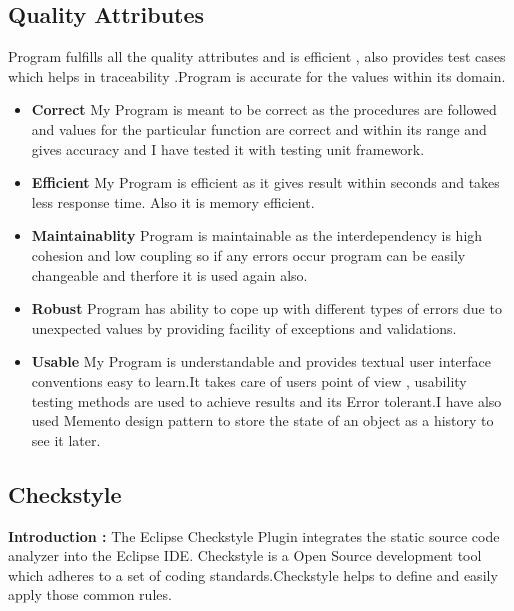 \documentclass[12pt]{report}
\begin{document}
\subsection{Quality Attributes}
\noindent  Program fulfills all the quality attributes and is efficient , also provides test cases which helps in traceability .Program is accurate for the values within its domain.
\begin{itemize}
    \item\textbf {Correct}
    \newline
    My Program is meant to be correct as the procedures are followed and values for the particular function are correct and within its range and gives accuracy and I have tested it with testing unit framework.
    \item\textbf {Efficient}
    \newline
    My Program is efficient as it gives result within seconds and takes less response time. Also it is memory efficient.
    \item\textbf {Maintainablity}
    \newline
    Program is maintainable as the interdependency is high cohesion and low coupling so if any errors occur program can be easily changeable and therfore it is used again also.
    \item\textbf {Robust}
    \newline
    Program has ability to cope up with different types of errors due to unexpected values by providing facility of exceptions and validations.
    \item\textbf {Usable}
    \newline
    My Program is understandable and provides textual user interface conventions easy to learn.It takes care of users point of view , usability testing methods are used to achieve results and its Error tolerant.I have also used Memento design pattern to store the state of an object as a history to see it later.
   
\end{itemize}

   
\clearpage
\subsection{Checkstyle}
\noindent
     \item \textbf{Introduction : } The Eclipse Checkstyle Plugin integrates the static source code analyzer into the Eclipse IDE. 
Checkstyle is a Open Source development tool which adheres to a set of coding standards.Checkstyle helps to define and easily apply those common rules.
\end{document}

